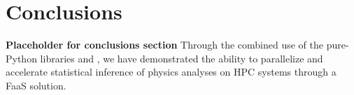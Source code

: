 \section{Conclusions}\label{sec:conclusions}

\textbf{Placeholder for conclusions section}
Through the combined use of the pure-Python libraries \funcX{} and \pyhf{}, we have demonstrated the ability to parallelize and accelerate statistical inference of physics analyses on HPC systems through a FaaS solution.

